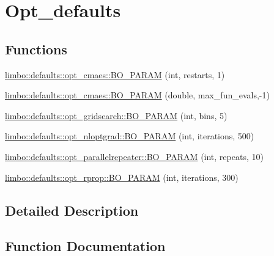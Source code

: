 \hypertarget{group__opt__defaults}{}\section{Opt\+\_\+defaults}
\label{group__opt__defaults}
\subsection*{Functions}
\begin{DoxyCompactItemize}
\item 
\hyperlink{group__opt__defaults_gaba7127b5e591a72095bd6c3a4155828d}{limbo\+::defaults\+::opt\+\_\+cmaes\+::\+B\+O\+\_\+\+P\+A\+R\+A\+M} (int, restarts, 1)
\item 
\hyperlink{group__opt__defaults_ga5130bd236acff913c59380059474ebab}{limbo\+::defaults\+::opt\+\_\+cmaes\+::\+B\+O\+\_\+\+P\+A\+R\+A\+M} (double, max\+\_\+fun\+\_\+evals,-\/1)
\item 
\hyperlink{group__opt__defaults_ga0ce56e9b25771d8a1b381b6ec132b8fe}{limbo\+::defaults\+::opt\+\_\+gridsearch\+::\+B\+O\+\_\+\+P\+A\+R\+A\+M} (int, bins, 5)
\item 
\hyperlink{group__opt__defaults_ga4b0e251e3b7440148225201bcfc61f26}{limbo\+::defaults\+::opt\+\_\+nloptgrad\+::\+B\+O\+\_\+\+P\+A\+R\+A\+M} (int, iterations, 500)
\item 
\hyperlink{group__opt__defaults_ga4dfaebabf04a129cbb565807ed31f2de}{limbo\+::defaults\+::opt\+\_\+parallelrepeater\+::\+B\+O\+\_\+\+P\+A\+R\+A\+M} (int, repeats, 10)
\item 
\hyperlink{group__opt__defaults_gadf6a8058cda20130ad992631e561eb5a}{limbo\+::defaults\+::opt\+\_\+rprop\+::\+B\+O\+\_\+\+P\+A\+R\+A\+M} (int, iterations, 300)
\end{DoxyCompactItemize}


\subsection{Detailed Description}


\subsection{Function Documentation}
\hypertarget{group__opt__defaults_ga0ce56e9b25771d8a1b381b6ec132b8fe}{}
